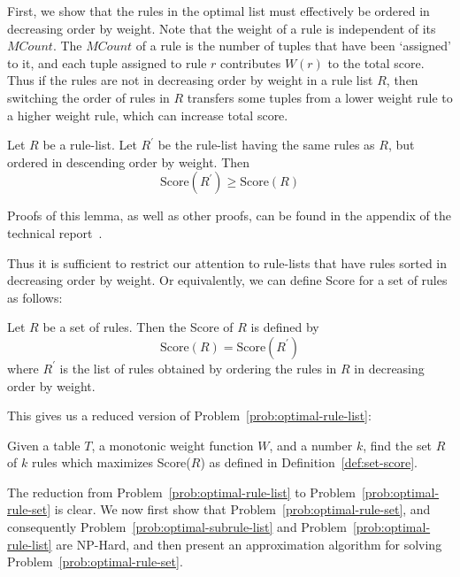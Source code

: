 First, we show that the rules in the optimal list must effectively be ordered in decreasing order by weight. Note that the weight of a rule is independent of its $MCount$. The $MCount$ of a rule is the number of tuples that have been `assigned' to it, and each tuple assigned to rule $r$ contributes $W(r)$ to the total score. Thus if the rules are not in decreasing order by weight in a rule list $R$, then switching the order of rules in $R$ transfers some tuples from a lower weight rule to a higher weight rule, which can increase total score.

\begin{lemma}\label{lemma:rule-ordering}
Let $R$ be a rule-list. Let $R^{\prime}$ be the rule-list having the same rules as $R$, but ordered in descending order by weight. Then
$$\text{Score}(R^{\prime}) \geq \text{Score}(R)$$
\end{lemma}
Proofs of this lemma, as well as other proofs, can be found in the appendix of the technical report~\cite{tr}. 

\noindent Thus it is sufficient to restrict our attention to rule-lists that have rules sorted in decreasing order by weight. Or equivalently, we can define Score for a set of rules as follows:

\begin{definition}\label{def:set-score}
Let $R$ be a set of rules. Then the Score of $R$ is defined by
$$\text{Score}(R) = \text{Score}(R^{\prime})$$
where $R^{\prime}$ is the list of rules obtained by ordering the rules in $R$ in decreasing order by weight.
\end{definition}

This gives us a reduced version of Problem~\ref{prob:optimal-rule-list}: 
\begin{problem}\label{prob:optimal-rule-set}
Given a table $T$, a monotonic weight function $W$, and a number $k$, find the set $R$ of $k$ rules which maximizes Score($R$) as defined in Definition~\ref{def:set-score}.
\end{problem}

\noindent The reduction from Problem~\ref{prob:optimal-rule-list} to Problem~\ref{prob:optimal-rule-set} is clear. We now first show that Problem~\ref{prob:optimal-rule-set}, and consequently Problem~\ref{prob:optimal-subrule-list} and Problem~\ref{prob:optimal-rule-list} are NP-Hard, and then present an approximation algorithm for solving Problem~\ref{prob:optimal-rule-set}.

